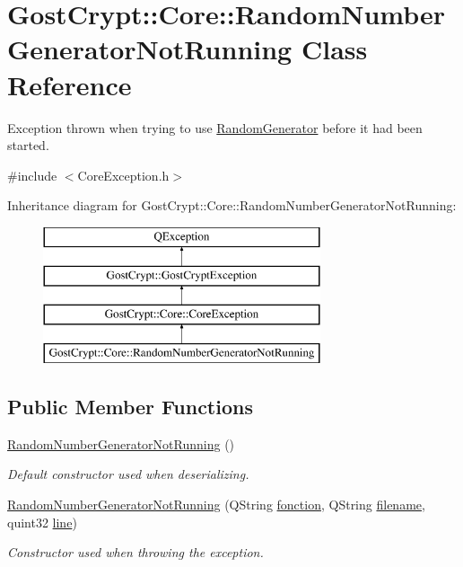 \hypertarget{class_gost_crypt_1_1_core_1_1_random_number_generator_not_running}{}\section{Gost\+Crypt\+:\+:Core\+:\+:Random\+Number\+Generator\+Not\+Running Class Reference}
\label{class_gost_crypt_1_1_core_1_1_random_number_generator_not_running}


Exception thrown when trying to use \hyperlink{class_gost_crypt_1_1_core_1_1_random_generator}{Random\+Generator} before it had been started.  




{\ttfamily \#include $<$Core\+Exception.\+h$>$}

Inheritance diagram for Gost\+Crypt\+:\+:Core\+:\+:Random\+Number\+Generator\+Not\+Running\+:\begin{figure}[H]
\begin{center}
\leavevmode
\includegraphics[height=4.000000cm]{class_gost_crypt_1_1_core_1_1_random_number_generator_not_running}
\end{center}
\end{figure}
\subsection*{Public Member Functions}
\begin{DoxyCompactItemize}
\item 
\hyperlink{class_gost_crypt_1_1_core_1_1_random_number_generator_not_running_aed495cf0eaec6c81abe86e2d3107edc8}{Random\+Number\+Generator\+Not\+Running} ()
\begin{DoxyCompactList}\small\item\em Default constructor used when deserializing. \end{DoxyCompactList}\item 
\hyperlink{class_gost_crypt_1_1_core_1_1_random_number_generator_not_running_ae7f35ff2b0421c708960f1aae7cabf01}{Random\+Number\+Generator\+Not\+Running} (Q\+String \hyperlink{class_gost_crypt_1_1_gost_crypt_exception_a29b8c93d5efbb1ff369107385725a939}{fonction}, Q\+String \hyperlink{class_gost_crypt_1_1_gost_crypt_exception_a749a12375f4ba9d502623b99d8252f38}{filename}, quint32 \hyperlink{class_gost_crypt_1_1_gost_crypt_exception_abf506d911f12a4e969eea500f90bd32c}{line})
\begin{DoxyCompactList}\small\item\em Constructor used when throwing the exception. \end{DoxyCompactList}\end{DoxyCompactItemize}
